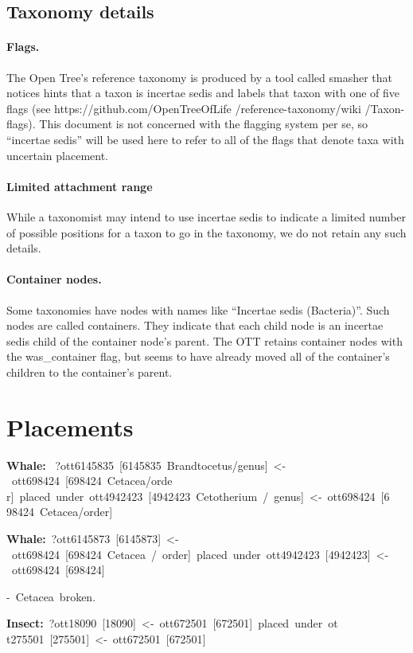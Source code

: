 \documentclass[english]{article}
\begin{document}
\subsection{Taxonomy details}

\paragraph{Flags.}
The Open Tree's reference taxonomy is produced by a tool called
smasher that notices hints that a taxon is incertae sedis and labels
that taxon with one of five flags (see https://github.com/OpenTreeOfLife
/reference-taxonomy/wiki /Taxon-flags). This document is not concerned
with the flagging system per se, so ``incertae sedis'' will be used here
to refer to all of the flags that denote taxa with uncertain
placement.

\paragraph{Limited attachment range}
While a taxonomist may intend to use incertae sedis to
indicate a limited number of possible positions for a taxon to go in
the taxonomy, we do not retain any such details.

\paragraph{Container nodes.}
Some taxonomies have nodes with names like ``Incertae sedis (Bacteria)''.
Such nodes are called containers. They indicate that each child node is an
incertae sedis child of the container node's parent. The OTT retains container
nodes with the was\_container flag, but seems to have already moved all of the
container's children to the container's parent.

\section{Placements}
\textbf{Whale:}~ ?ott6145835~{[}6145835~Brandtocetus/genus{]}~<-~ott698424~{[}698424~Cetacea/orde r{]}~placed~under~ott4942423~{[}4942423~Cetotherium~/~genus{]}~<-~ott698424~{[}6 98424~Cetacea/order{]}

\textbf{Whale:}~?ott6145873~{[}6145873{]}~<-~ott698424~{[}698424~Cetacea~/~order{]}~placed~under~ott4942423~{[}4942423{]}~<-~ott698424~{[}698424{]}~

-~Cetacea~broken.

\textbf{Insect:}~?ott18090~{[}18090{]}~<-~ott672501~{[}672501{]}~placed~under~ot t275501~{[}275501{]}~<-~ott672501~{[}672501{]}
\end{document}
